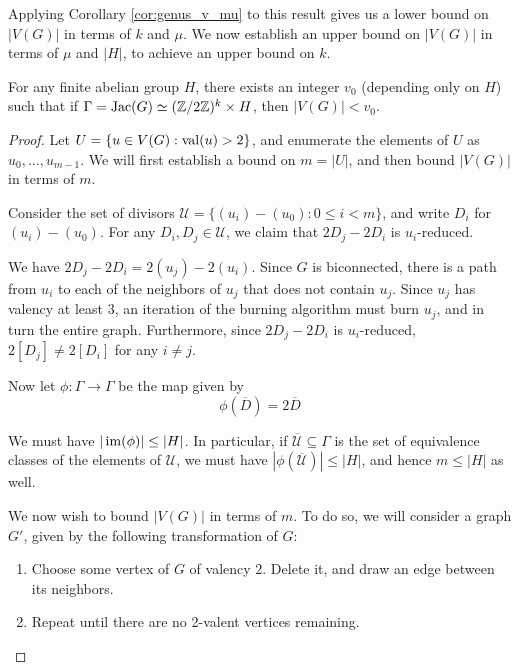 \documentclass{amsart}
\begin{document}
Applying Corollary \ref{cor:genus_v_mu} to this result gives us a
lower bound on $|V(G)|$ in terms of $k$ and $\mu$. We now establish an
upper bound on $|V(G)|$ in terms of $\mu$ and $|H|$, to achieve an
upper bound on $k$.

\begin{prop}
  \label{prop:v_bound}
  For any finite abelian group $H$, there exists an integer $v_0$
  (depending only on $H$) such that if $\Gamma = \operatorname{Jac}(G) \simeq (\mathbb{Z}/2\mathbb{Z})^k
  \times H$, then $|V(G)| < v_0$.
\end{prop}

\begin{proof}
  Let $U = \{u \in V(G) : \operatorname{val}(u) > 2\}$, and enumerate the elements
  of $U$ as $u_0, \ldots, u_{m-1}$. We will first establish a bound on
  $m = |U|$, and then bound $|V(G)|$ in terms of $m$.
  
  Consider the set of divisors $\mathcal{U} = \{(u_i) - (u_0) : 0 \le
  i < m\}$, and write $D_i$ for $(u_i) - (u_0)$. For any $D_i, D_j \in
  \mathcal{U}$, we claim that $2D_j - 2D_i$ is $u_i$-reduced.

  We have $2D_j - 2D_i = 2(u_j) - 2(u_i)$. Since $G$ is biconnected,
  there is a path from $u_i$ to each of the neighbors of $u_j$ that
  does not contain $u_j$. Since $u_j$ has valency at least $3$, an
  iteration of the burning algorithm must burn $u_j$, and in turn the
  entire graph. Furthermore, since $2D_j - 2D_i$ is $u_i$-reduced,
  $2[D_j] \ne 2[D_i]$ for any $i \ne j$.

  Now let $\phi:\Gamma \to \Gamma$ be the map given by
  \[
  \phi(\overline{D}) = 2\overline{D}
  \] 

  We must have $|\operatorname{im}(\phi)| \le |H|$. In particular, if
  $\overline{\mathcal{U}} \subseteq \Gamma$ is the set of equivalence
  classes of the elements of $\mathcal{U}$, we must have
  $|\phi(\overline{\mathcal{U}})| \le |H|$, and hence $m \le |H|$ as
  well.

  We now wish to bound $|V(G)|$ in terms of $m$. To do so, we will
  consider a graph $G'$, given by the following transformation of $G$:

  \begin{enumerate}
  \item Choose some vertex of $G$ of valency $2$. Delete it, and
    draw an edge between its neighbors.
  \item Repeat until there are no 2-valent vertices remaining.
  \end{enumerate}


\end{proof}
\end{document}
